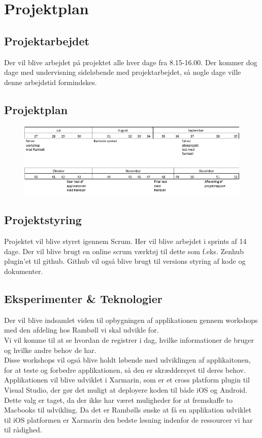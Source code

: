
	\chapter{Projektplan}
	
	\section{Projektarbejdet}
	Der vil blive arbejdet på projektet alle hver dage fra 8.15-16.00. Der kommer dog dage med undervisning sideløbende med projektarbejdet, så nogle dage ville denne arbejdstid formindskes. \\
	
	\section{Projektplan}
	\begin{figure}[h!]
		\centering
		\includegraphics[width=1\linewidth]{Projektplan/Projektplan}
	\end{figure}

	\section{Projektstyring}
	Projektet vil blive styret igennem Scrum. Her vil blive arbejdet i sprints af 14 dage. Der vil blive brugt en online scrum værktøj til dette som f.eks. Zenhub plugin'et til github. Github vil også blive brugt til versions styring af kode og dokumenter. \\
	
	\section{Eksperimenter \& Teknologier}
	Der vil blive indsamlet viden til opbygningen af applikationen gennem workshops med den afdeling hos Rambøll vi skal udvikle for.\\
	Vi vil komme til at se hvordan de registrer i dag, hvilke informationer de bruger og hvilke andre behov de har.\\
	Disse workshops vil også blive holdt løbende med udviklingen af applikaitonen, for at teste og forbedre applikationen, så den er skræddersyet til deres behov. \\
	
	Applikationen vil blive udviklet i Xarmarin, som er et cross platform plugin til Visual Studio, der gør det muligt at deployere koden til både iOS og Android.\\
	Dette valg er taget, da der ikke har været muligheder for at fremskaffe to Macbooks til udvikling. Da det er Rambølls ønske at få en applikation udviklet til iOS platformen er Xarmarin den bedste løsning indenfor de ressourcer vi har til rådighed. 

